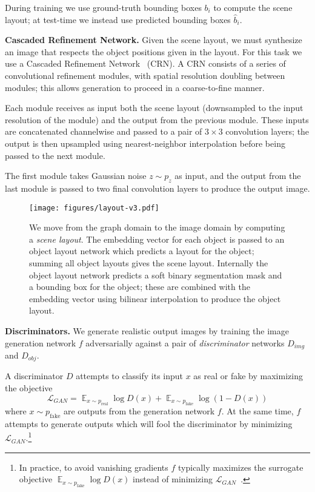 \documentclass[10pt,twocolumn,letterpaper]{article}
\newcommand{\LL}{\mathcal{L}}
\newcommand{\EE}{\mathop{\mathbb{E}}}
\begin{document}
During training we use ground-truth bounding boxes $b_i$ to compute the scene
layout; at test-time we instead use predicted bounding boxes $\hat b_i$.

\textbf{Cascaded Refinement Network.}
Given the scene layout, we must synthesize an image that respects the object
positions given in the layout. For this task we use a Cascaded Refinement
Network~\cite{chen2017photographic} (CRN). A CRN consists of a series of
convolutional refinement modules, with spatial resolution doubling between
modules; this allows generation to proceed in a coarse-to-fine manner.

Each module receives as input both the scene layout (downsampled to the input
resolution of the module) and the output from the previous module. These inputs
are concatenated channelwise and passed to a pair of $3\times3$ convolution
layers; the output is then upsampled using nearest-neighbor interpolation
before being passed to the next module.

The first module takes Gaussian noise $z\sim p_z$ as input, and the output from the last
module is passed to two final convolution layers to produce the output image.

\begin{figure}[t]
  \centering
  \texttt{[image: figures/layout-v3.pdf]}
  \caption{
    We move from the graph domain to the image domain by computing a
    \emph{scene layout}. The embedding vector for each object is passed to an
    object layout network which predicts a layout for the object;
    summing all object layouts gives the scene layout. Internally the object
    layout network predicts a soft binary segmentation mask and a bounding box
    for the object; these are combined with the embedding vector using bilinear
    interpolation to produce the object layout.
  }
  \label{fig:layout}
\end{figure}

\textbf{Discriminators.}
We generate realistic output images by training the image generation network $f$
adversarially against a pair of \emph{discriminator} networks $D_{img}$ and $D_{obj}$.

A discriminator $D$ attempts to classify its input $x$ as real or fake by maximizing
the objective~\cite{goodfellow2014generative}
\begin{equation}
  \LL_{GAN} = \EE_{x\sim p_{\textrm{real}}} \log D(x) + \EE_{x\sim p_{\textrm{fake}}} \log(1 - D(x))
\end{equation}
where $x\sim p_{\textrm{fake}}$ are outputs from the generation network $f$. At the same time,
$f$ attempts to generate outputs which will fool the discriminator by minimizing
$\LL_{GAN}$.\footnote{In practice, to avoid vanishing gradients $f$ typically maximizes
the surrogate objective $\EE_{x\sim p_{\textrm{fake}}} \log D(x)$ instead of minimizing
$\LL_{GAN}$~\cite{goodfellow2014generative}.}
\end{document}
